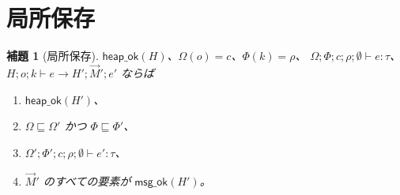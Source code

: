 \documentclass[11pt,a4paper]{ltjsarticle}
\newtheorem{lemma}[theorem]{補題}
\theoremstyle{definition}
\theoremstyle{remark}
\newcommand{\Om}{\Omega}
\newcommand{\Ph}{\Phi}
\newcommand{\heapok}{\textsf{heap\_ok}}
\newcommand{\msgok}{\textsf{msg\_ok}}
\begin{document}
\section{局所保存}

\begin{lemma}[局所保存]\label{lem:lpres}
$\heapok(H)$、$\Om(o) = c$、$\Ph(k) = \rho$、
$\Om;\Ph;c;\rho;\emptyset \vdash e : \tau$、
$H;o;k \vdash e \longrightarrow H';\vec{M}';e'$ ならば
\begin{enumerate}
\item $\heapok(H')$、
\item $\Om \sqsubseteq \Om'$ かつ $\Ph \sqsubseteq \Ph'$、
\item $\Om';\Ph';c;\rho;\emptyset \vdash e' : \tau$、
\item $\vec{M}'$ のすべての要素が $\msgok(H')$。
\end{enumerate}
\end{lemma}
\end{document}
